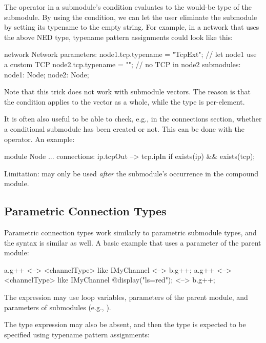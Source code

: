 The  operator in a submodule's  condition
evaluates to the would-be type of the submodule. By using the  condition, we can let the user eliminate the  submodule by setting
its typename to the empty string. For example, in a network that uses the above
NED type, typename pattern assignments could look like this:

\begin{ned}
network Network
{
    parameters:
        node1.tcp.typename = "TcpExt"; // let node1 use a custom TCP
        node2.tcp.typename = ""; // no TCP in node2
    submodules:
        node1: Node;
        node2: Node;
}
\end{ned}

Note that this trick does not work with submodule vectors. The reason is that
the condition applies to the vector as a whole, while the type is per-element.

It is often also useful to be able to check, e.g., in the connections section,
whether a conditional submodule has been created or not. This can be done with
the  operator. An example:

\begin{ned}
module Node
{
    ...
    connections:
        ip.tcpOut --> tcp.ipIn if exists(ip) && exists(tcp);
}
\end{ned}

Limitation:  may only be used \textit{after} the submodule's
occurrence in the compound module.




\subsection{Parametric Connection Types}
\label{sec:ned-lang:connection-like}

Parametric connection types work similarly to parametric submodule types, and
the syntax is similar as well. A basic example that uses a parameter of the
parent module:

\begin{ned}
a.g++ <--> <channelType> like IMyChannel <--> b.g++;
a.g++ <--> <channelType> like IMyChannel {@display("ls=red");} <--> b.g++;
\end{ned}

The expression may use loop variables, parameters of the parent module, and
parameters of submodules (e.g., ).

The type expression may also be absent, and then the type is expected to be
specified using typename pattern assignments:

